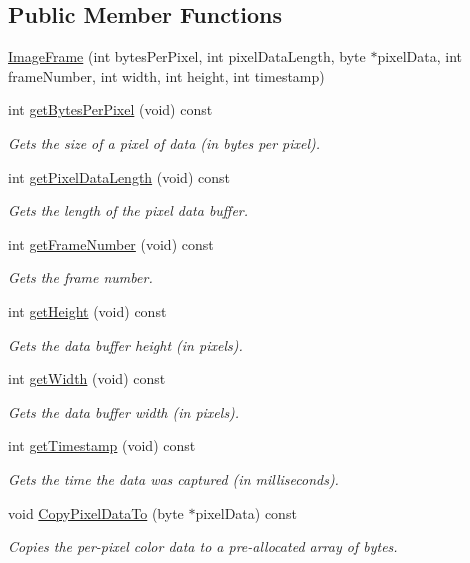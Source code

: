 \subsection*{\-Public \-Member \-Functions}
\begin{DoxyCompactItemize}
\item 
\hyperlink{class_image_frame_a472362c4169efca020d9332902956cdc}{\-Image\-Frame} (int bytes\-Per\-Pixel, int pixel\-Data\-Length, byte $\ast$pixel\-Data, int frame\-Number, int width, int height, int timestamp)
\item 
int \hyperlink{class_image_frame_a83b3e325a361b7202916cb302463920f}{get\-Bytes\-Per\-Pixel} (void) const 
\begin{DoxyCompactList}\small\item\em \-Gets the size of a pixel of data (in bytes per pixel). \end{DoxyCompactList}\item 
int \hyperlink{class_image_frame_a5ffeadffc476ed4a1529e190b06b02bf}{get\-Pixel\-Data\-Length} (void) const 
\begin{DoxyCompactList}\small\item\em \-Gets the length of the pixel data buffer. \end{DoxyCompactList}\item 
int \hyperlink{class_image_frame_ab64aeb9fd5652066cc9dfd2b14a0829d}{get\-Frame\-Number} (void) const 
\begin{DoxyCompactList}\small\item\em \-Gets the frame number. \end{DoxyCompactList}\item 
int \hyperlink{class_image_frame_a381bd28ba7458bf83b18fd9248e4d9dc}{get\-Height} (void) const 
\begin{DoxyCompactList}\small\item\em \-Gets the data buffer height (in pixels). \end{DoxyCompactList}\item 
int \hyperlink{class_image_frame_a1846b6e7d338d2512afb9454cffe9392}{get\-Width} (void) const 
\begin{DoxyCompactList}\small\item\em \-Gets the data buffer width (in pixels). \end{DoxyCompactList}\item 
int \hyperlink{class_image_frame_aa8f22c9620e66b4d39cba04be66d8e2f}{get\-Timestamp} (void) const 
\begin{DoxyCompactList}\small\item\em \-Gets the time the data was captured (in milliseconds). \end{DoxyCompactList}\item 
void \hyperlink{class_image_frame_afd8551ca13d8cec8e7b59598e43536b0}{\-Copy\-Pixel\-Data\-To} (byte $\ast$pixel\-Data) const 
\begin{DoxyCompactList}\small\item\em \-Copies the per-\/pixel color data to a pre-\/allocated array of bytes. \end{DoxyCompactList}\end{DoxyCompactItemize}


